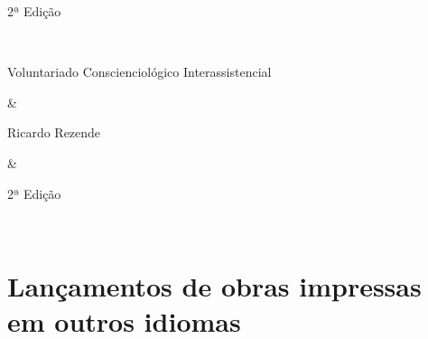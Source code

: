 \documentclass{gescons}
\begin{document}
\begin{longtable}[]
\begin{minipage}[b]{\linewidth}
2ª Edição
\end{minipage} \\
\hline
\begin{minipage}[b]{\linewidth}\raggedright
Voluntariado Conscienciológico Interassistencial
\end{minipage} & \begin{minipage}[b]{\linewidth}\raggedright
Ricardo Rezende
\end{minipage} & \begin{minipage}[b]{\linewidth}\centering
2ª Edição
\end{minipage} \\
\midrule\noalign{}
\endhead
\bottomrule\noalign{}
\endlastfoot
\end{longtable}

\section*{Lançamentos de obras impressas em outros idiomas}
\nopagebreak[4] %
\end{document}
